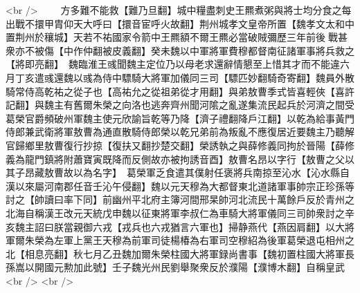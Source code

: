 <br />
　　方多難不能救【難乃旦翻】城中糧盡刺史王羆煮粥與將士均分食之每出戰不擐甲胄仰天大呼曰【擐音宦呼火故翻】荆州城孝文皇帝所置【魏孝文太和中置荆州於穰城】天若不祐國家令箭中王羆額不爾王羆必當破賊彌歷三年前後戰甚衆亦不被傷【中作仲翻被皮義翻】癸未魏以中軍將軍費穆都督南征諸軍事將兵救之【將即亮翻】　魏臨淮王彧聞魏主定位乃以母老求還辭情懇至上惜其才而不能違六月丁亥遣彧還魏以彧為侍中驃騎大將軍加儀同三司【驃匹妙翻騎奇寄翻】魏員外散騎常侍高乾祐之從子也【高祐允之從祖弟從才用翻】與弟敖曹季式皆喜輕俠【喜許記翻】與魏主有舊爾朱榮之向洛也逃奔齊州聞河隂之亂遂集流民起兵於河濟之間受葛榮官爵頻破州軍魏主使元欣諭旨乾等乃降【濟子禮翻降戶江翻】以乾為給事黃門侍郎兼武衛將軍敖曹為通直散騎侍郎榮以乾兄弟前為叛亂不應復居近要魏主乃聽解官歸鄉里敖曹復行抄掠【復扶又翻抄楚交翻】榮誘執之與薛修義同拘於晉陽【薛修義為龍門鎮將附蕭寶寅既降而反側故亦被拘誘音酉】敖曹名昂以字行【敖曹之父以其子昂藏敖曹故以為名字】　葛榮軍乏食遣其僕射任褒將兵南掠至沁水【沁水縣自漢以來屬河南郡任音壬沁午侵翻】魏以元天穆為大都督東北道諸軍事帥宗正珍孫等討之【帥讀曰率下同】前幽州平北府主簿河間邢杲帥河北流民十萬餘戶反於青州之北海自稱漢王改元天統戊申魏以征東將軍李叔仁為車騎大將軍儀同三司帥衆討之辛亥魏主詔曰朕當親御六戎【戎兵也六戎猶言六軍也】掃静燕代【燕因肩翻】以大將軍爾朱榮為左軍上黨王天穆為前軍司徒楊椿為右軍司空穆紹為後軍葛榮退屯相州之北【相息亮翻】秋七月乙丑魏加爾朱榮柱國大將軍録尚書事【魏初置柱國大將軍長孫嵩以開國元勲加此號】壬子魏光州民劉舉聚衆反於濮陽【濮博木翻】自稱皇武<br />
<br />
